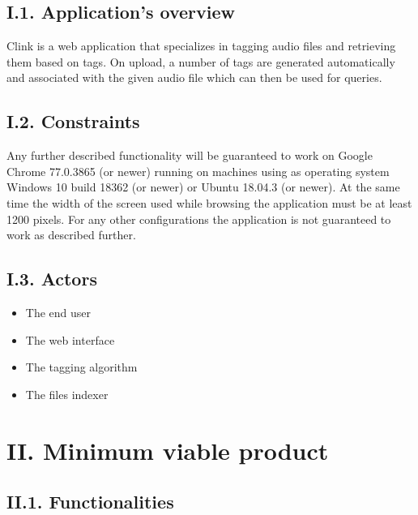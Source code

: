 \documentclass[11pt, a4papper]{report}
\theoremstyle{plain}
\theoremstyle{definition}
\theoremstyle{definition}
\theoremstyle{proposition}
\begin{document}
\section*{I.1. Application's overview}

Clink is a web application that specializes in tagging audio files and retrieving them based on tags. On upload, a number of tags are generated automatically and associated with the given audio file which can then be used for queries.

\section*{I.2. Constraints}

Any further described functionality will be guaranteed to work on Google Chrome 77.0.3865 (or newer) running on machines using as operating system Windows 10 build 18362 (or newer) or Ubuntu 18.04.3 (or newer). At the same time the width of the screen used while browsing the application must be at least 1200 pixels. For any other configurations the application is not guaranteed to work as described further.

\section*{I.3. Actors}

\begin{itemize}
	\item{The end user}
	\item{The web interface}
	\item{The tagging algorithm}
	\item{The files indexer}
\end{itemize}

\chapter*{II. Minimum viable product}

\section*{II.1. Functionalities}
\end{document}
